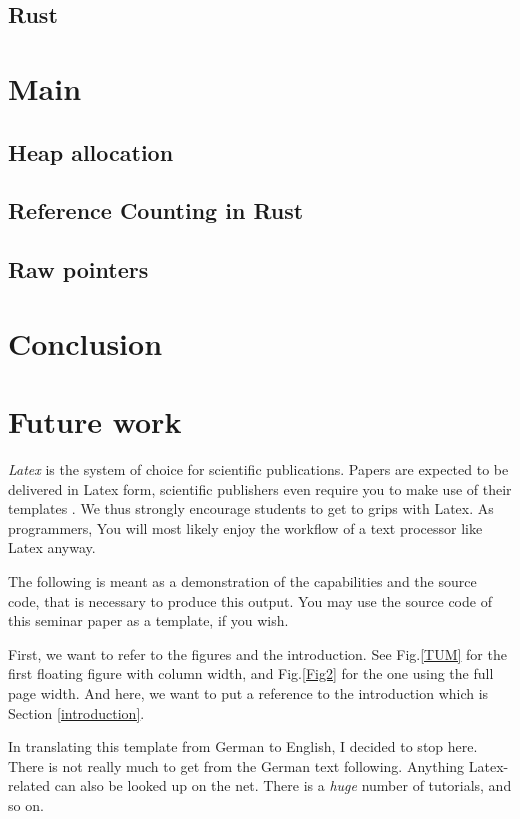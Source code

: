 \documentclass[twocolumn]{article}
\begin{document}
\subsection{Rust}
\section{Main}
\subsection{Heap allocation}
\subsection{Reference Counting in Rust}
\subsection{Raw pointers}
\section{Conclusion}
\section{Future work}

\emph{Latex} is the system of choice for scientific publications. Papers
are expected to be delivered in Latex form, scientific publishers
even require you to make use of their templates \cite{springer,acm}.
We thus strongly encourage students to get to grips with Latex. As
programmers, You will most likely enjoy the workflow of a text
processor like Latex anyway.

The following is meant as a demonstration of the capabilities and
the source code, that is necessary to produce this output. You may
use the source code of this seminar paper as a template, if you wish.


First, we want to refer to the figures and the introduction.
See Fig.\ref{TUM} for the first floating figure with column width,
and Fig.\ref{Fig2} for the one using the full page width.
And here, we want to put a reference to the introduction which is
Section \ref{introduction}.

In translating this template from German to English, I decided to
stop here. There is not really much to get from the German text
following. Anything Latex-related can also be looked up on the
net. There is a {\it huge} number of tutorials, and so on.
\end{document}
